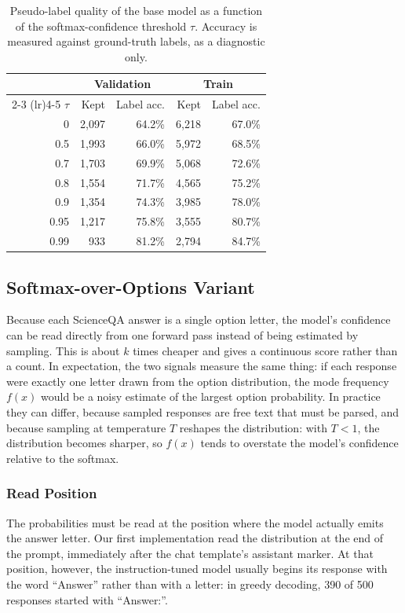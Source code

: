 \documentclass{article}
\begin{document}
\begin{table}[t]
\centering
\small
\setlength{\tabcolsep}{4pt}
\begin{tabular}{rrrrr}
\toprule
& \multicolumn{2}{c}{Validation} & \multicolumn{2}{c}{Train} \\
\cmidrule(lr){2-3} \cmidrule(lr){4-5}
$\tau$ & Kept & Label acc. & Kept & Label acc. \\
\midrule
0 & 2,097 & 64.2\% & 6,218 & 67.0\% \\
0.5 & 1,993 & 66.0\% & 5,972 & 68.5\% \\
0.7 & 1,703 & 69.9\% & 5,068 & 72.6\% \\
0.8 & 1,554 & 71.7\% & 4,565 & 75.2\% \\
0.9 & 1,354 & 74.3\% & 3,985 & 78.0\% \\
0.95 & 1,217 & 75.8\% & 3,555 & 80.7\% \\
0.99 & 933 & 81.2\% & 2,794 & 84.7\% \\
\bottomrule
\end{tabular}
\caption{Pseudo-label quality of the base model as a function of the softmax-confidence threshold $\tau$. Accuracy is measured against ground-truth labels, as a diagnostic only.}
\label{tab:tau}
\end{table}

\subsection{Softmax-over-Options Variant}
Because each ScienceQA answer is a single option letter, the model's confidence can be read directly from one forward pass instead of being estimated by sampling. This is about $k$ times cheaper and gives a continuous score rather than a count. In expectation, the two signals measure the same thing: if each response were exactly one letter drawn from the option distribution, the mode frequency $f(x)$ would be a noisy estimate of the largest option probability. In practice they can differ, because sampled responses are free text that must be parsed, and because sampling at temperature $T$ reshapes the distribution: with $T < 1$, the distribution becomes sharper, so $f(x)$ tends to overstate the model's confidence relative to the softmax.

\subsubsection{Read Position}
The probabilities must be read at the position where the model actually emits the answer letter. Our first implementation read the distribution at the end of the prompt, immediately after the chat template's assistant marker. At that position, however, the instruction-tuned model usually begins its response with the word ``Answer'' rather than with a letter: in greedy decoding, 390 of 500 responses started with ``Answer:''.
\end{document}
